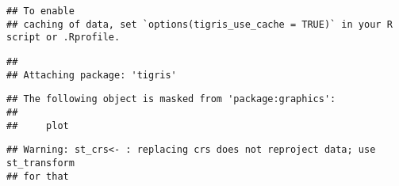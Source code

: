 \documentclass[]{article}
\newenvironment{Shaded}{\begin{snugshade}}{\end{snugshade}}
\newcommand{\KeywordTok}[1]{\textcolor[rgb]{0.13,0.29,0.53}{\textbf{#1}}}
\newcommand{\DataTypeTok}[1]{\textcolor[rgb]{0.13,0.29,0.53}{#1}}
\newcommand{\DecValTok}[1]{\textcolor[rgb]{0.00,0.00,0.81}{#1}}
\newcommand{\StringTok}[1]{\textcolor[rgb]{0.31,0.60,0.02}{#1}}
\newcommand{\CommentTok}[1]{\textcolor[rgb]{0.56,0.35,0.01}{\textit{#1}}}
\newcommand{\OperatorTok}[1]{\textcolor[rgb]{0.81,0.36,0.00}{\textbf{#1}}}
\newcommand{\NormalTok}[1]{#1}
\begin{document}
\begin{verbatim}
## To enable 
## caching of data, set `options(tigris_use_cache = TRUE)` in your R script or .Rprofile.
\end{verbatim}

\begin{verbatim}
## 
## Attaching package: 'tigris'
\end{verbatim}

\begin{verbatim}
## The following object is masked from 'package:graphics':
## 
##     plot
\end{verbatim}

\begin{Shaded}
\end{Shaded}

\begin{verbatim}
## Warning: st_crs<- : replacing crs does not reproject data; use st_transform
## for that
\end{verbatim}
\end{document}
